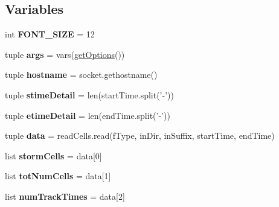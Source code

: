\subsection*{Variables}
\begin{DoxyCompactItemize}
\item 
\hypertarget{namespacebest__track_ad188c3603f85c3e42bc849914104de84}{int {\bfseries F\-O\-N\-T\-\_\-\-S\-I\-Z\-E} = 12}\label{namespacebest__track_ad188c3603f85c3e42bc849914104de84}

\item 
\hypertarget{namespacebest__track_a67f9d5349c90a840d4a09022531743c3}{tuple {\bfseries args} = vars(\hyperlink{namespacebest__track_a09088a9013df27853bf9f485f05f0a72}{get\-Options}())}\label{namespacebest__track_a67f9d5349c90a840d4a09022531743c3}

\item 
\hypertarget{namespacebest__track_aacc2d16ab53ea982e37e72bc68ee00ac}{tuple {\bfseries hostname} = socket.\-gethostname()}\label{namespacebest__track_aacc2d16ab53ea982e37e72bc68ee00ac}

\item 
\hypertarget{namespacebest__track_a7c8bc59cb59e6f944e182ae4f1c1ac5c}{tuple {\bfseries stime\-Detail} = len(start\-Time.\-split('-\/'))}\label{namespacebest__track_a7c8bc59cb59e6f944e182ae4f1c1ac5c}

\item 
\hypertarget{namespacebest__track_ab451bc85fb0a37d935bc56db27a15342}{tuple {\bfseries etime\-Detail} = len(end\-Time.\-split('-\/'))}\label{namespacebest__track_ab451bc85fb0a37d935bc56db27a15342}

\item 
\hypertarget{namespacebest__track_a56da8c5dd3ae7596c98a0499cbe59ef1}{tuple {\bfseries data} = read\-Cells.\-read(f\-Type, in\-Dir, in\-Suffix, start\-Time, end\-Time)}\label{namespacebest__track_a56da8c5dd3ae7596c98a0499cbe59ef1}

\item 
\hypertarget{namespacebest__track_aa5027f0a13229bf94fce4d40f94a5fd7}{list {\bfseries storm\-Cells} = data\mbox{[}0\mbox{]}}\label{namespacebest__track_aa5027f0a13229bf94fce4d40f94a5fd7}

\item 
\hypertarget{namespacebest__track_a3b571432e5dc19ff05c6f1093d225576}{list {\bfseries tot\-Num\-Cells} = data\mbox{[}1\mbox{]}}\label{namespacebest__track_a3b571432e5dc19ff05c6f1093d225576}

\item 
\hypertarget{namespacebest__track_a7f0456e5798449a7accb69c1b11849be}{list {\bfseries num\-Track\-Times} = data\mbox{[}2\mbox{]}}\label{namespacebest__track_a7f0456e5798449a7accb69c1b11849be}


\end{DoxyCompactItemize}
